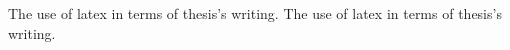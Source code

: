 
\enabstract

The use of latex in terms of thesis's writing.
The use of latex in terms of thesis's writing.

	


